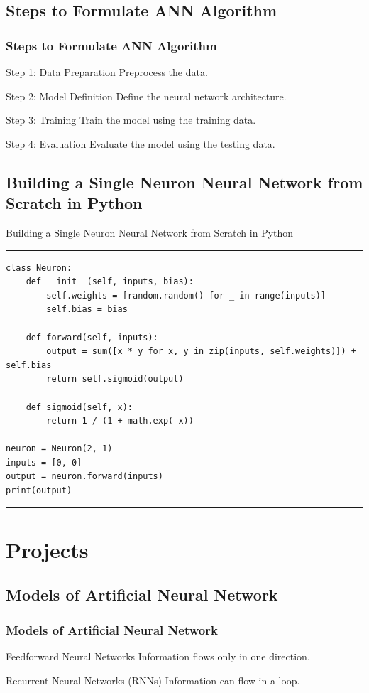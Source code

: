 \documentclass[aspectratio=169, hideothersubsections]{beamer}
\begin{document}
\subsection{Steps to Formulate ANN Algorithm}
\begin{frame}
    \frametitle{Steps to Formulate ANN Algorithm}
    \begin{block}{Step 1: Data Preparation}
        Preprocess the data.
    \end{block}
    \begin{block}{Step 2: Model Definition}
        Define the neural network architecture.
    \end{block}
    \begin{block}{Step 3: Training}
        Train the model using the training data.
    \end{block}
    \begin{block}{Step 4: Evaluation}
        Evaluate the model using the testing data.
    \end{block}
\end{frame}

\subsection{Building a Single Neuron Neural Network from Scratch in Python}
\begin{frame}[fragile]{Building a Single Neuron Neural Network from Scratch in Python}
\rule{\textwidth}{1pt}
\scriptsize
\begin{verbatim}
class Neuron:
    def __init__(self, inputs, bias):
        self.weights = [random.random() for _ in range(inputs)]
        self.bias = bias

    def forward(self, inputs):
        output = sum([x * y for x, y in zip(inputs, self.weights)]) + self.bias
        return self.sigmoid(output)

    def sigmoid(self, x):
        return 1 / (1 + math.exp(-x))

neuron = Neuron(2, 1)
inputs = [0, 0]
output = neuron.forward(inputs)
print(output)
\end{verbatim}
\rule{\textwidth}{1pt}
\end{frame}

\section{Projects}

\subsection{Models of Artificial Neural Network}
\begin{frame}
    \frametitle{Models of Artificial Neural Network}
    \begin{block}{Feedforward Neural Networks}
        Information flows only in one direction.
    \end{block}
    \begin{block}{Recurrent Neural Networks (RNNs)}
        Information can flow in a loop.
    \end{block}
\end{frame}
\end{document}
